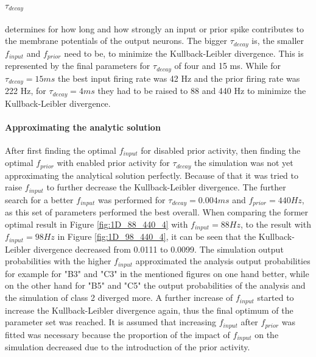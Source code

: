 \paragraph{$\tau_{decay}$} determines for how long and how strongly an input or prior spike contributes to the membrane potentials of the output neurons. The bigger $\tau_{decay}$ is, the smaller $f_{input}$ and $f_{prior}$ need to be, to minimize the Kullback-Leibler divergence. This is represented by the final parameters for $\tau_{decay}$ of four and 15 ms. While for $\tau_{decay} = 15 ms$ the best input firing rate was 42 Hz and the prior firing rate was 222 Hz, for $\tau_{decay} = 4 ms$ they had to be raised to 88 and 440 Hz to minimize the Kullback-Leibler divergence.

\paragraph{Approximating the analytic solution}
After first finding the optimal $f_{input}$ for disabled prior activity, then finding the optimal $f_{prior}$ with enabled prior activity for $\tau_{decay}$ the simulation was not yet approximating the analytical solution perfectly. Because of that it was tried to raise $f_{input}$ to further decrease the Kullback-Leibler divergence. The further search for a better $f_{input}$ was performed for $\tau_{decay} = 0.004 ms$ and $f_{prior} = 440 Hz$, as this set of parameters performed the best overall.
When comparing the former optimal result in Figure \ref{fig:1D_88_440_4} with $f_{input} = 88 Hz$, to the result with $f_{input} = 98 Hz$ in Figure \ref{fig:1D_98_440_4}, it can be seen that the Kullback-Leibler divergence decreased from 0.0111 to 0.0099. The simulation output probabilities with the higher $f_{input}$ approximated the analysis output probabilities for example for "B3" and "C3" in the mentioned figures on one hand better, while on the other hand for "B5" and "C5" the output probabilities of the analysis and the simulation of class 2 diverged more. A further increase of $f_{input}$ started to increase the Kullback-Leibler divergence again, thus the final optimum of the parameter set was reached. It is assumed that increasing $f_{input}$ after $f_{prior}$ was fitted was necessary because the proportion of the impact of $f_{input}$ on the simulation decreased due to the introduction of the prior activity.